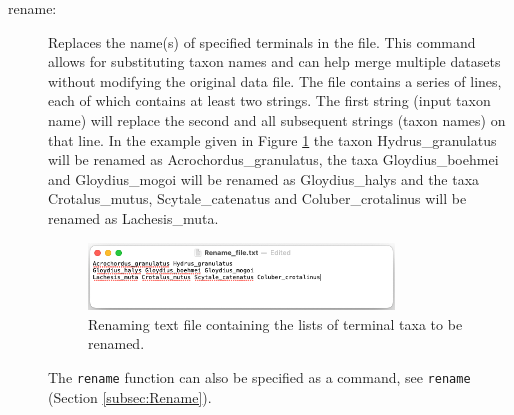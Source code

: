 \begin{description}
		\item [rename:] Replaces the name(s) of specified terminals in the file. This command allows 
		for substituting taxon names and can help merge multiple datasets without modifying the 
		original data file. The file contains a series of lines, each of which contains at least two strings. 
		The first string (input taxon name) will replace the second and all subsequent strings (taxon 
		names) on that line. In the example given in Figure \ref{renamefile} the taxon Hydrus\_granulatus 
		will be renamed as Acrochordus\_granulatus, the taxa Gloydius\_boehmei and Gloydius\_mogoi
		will be renamed as Gloydius\_halys and the taxa Crotalus\_mutus, Scytale\_catenatus and 
		Coluber\_crotalinus will be renamed as Lachesis\_muta.
		
		\begin{figure}
		\centering
		\includegraphics[width=0.8\textwidth]{Rename_file.jpg}
		\caption{Renaming text file containing the lists of terminal taxa to be renamed.}
		\label{renamefile}
		\end{figure}
		
		The \texttt{rename} function can also be specified as a command, see \texttt{rename}
		(Section \ref{subsec:Rename}).
					 

\end{description}
